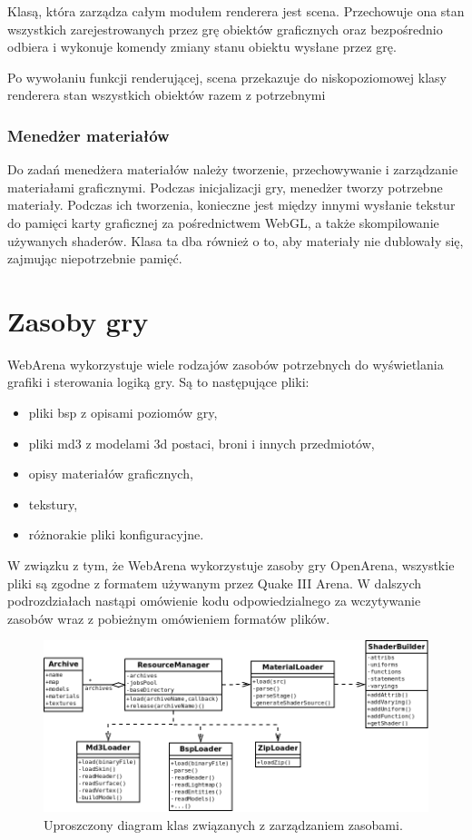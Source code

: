 Klasą, która zarządza całym modułem renderera jest scena. Przechowuje ona stan wszystkich
zarejestrowanych przez grę obiektów graficznych oraz bezpośrednio odbiera i wykonuje
komendy zmiany stanu obiektu wysłane przez grę.

Po wywołaniu funkcji renderującej, scena przekazuje do niskopoziomowej klasy renderera
stan wszystkich obiektów razem z potrzebnymi

\subsubsection{Menedżer materiałów}

Do zadań menedżera materiałów należy tworzenie, przechowywanie i zarządzanie materiałami
graficznymi. Podczas inicjalizacji gry, menedżer tworzy potrzebne materiały. Podczas
ich tworzenia, konieczne jest między innymi wysłanie tekstur do pamięci karty graficznej
za pośrednictwem WebGL, a także skompilowanie używanych shaderów. Klasa ta dba również
o to, aby materiały nie dublowały się, zajmując niepotrzebnie pamięć.

\section{Zasoby gry}
\label{sec:zasobyGry}

WebArena wykorzystuje wiele rodzajów zasobów potrzebnych do wyświetlania grafiki i sterowania
logiką gry. Są to następujące pliki:
\begin{itemize}
\item pliki bsp z opisami poziomów gry,
\item pliki md3 z modelami 3d postaci, broni i innych przedmiotów,
\item opisy materiałów graficznych,
\item tekstury,
\item różnorakie pliki konfiguracyjne.
\end{itemize}

W związku z tym, że WebArena wykorzystuje zasoby gry OpenArena, wszystkie pliki są zgodne
z formatem używanym przez Quake III Arena. W dalszych podrozdziałach nastąpi omówienie
kodu odpowiedzialnego za wczytywanie zasobów wraz z pobieżnym omówieniem formatów plików.

\begin{figure}[h]
  \centering
  \includegraphics[scale=0.5]{zasoby/rozdzial31/resources}  
  \caption{Uproszczony diagram klas związanych z zarządzaniem zasobami.}
  \label{fig:screen}
\end{figure}

